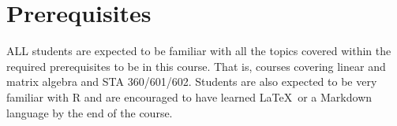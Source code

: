 \documentclass[11pt, a4paper]{article}
\begin{document}





\section{Prerequisites}
ALL students are expected to be familiar with all the topics covered within the required prerequisites to be in this course. That is, courses covering linear and matrix algebra and STA 360/601/602. Students are also expected to be very familiar with \textsf{R} and are encouraged to have learned \LaTeX \ or a Markdown language by the end of the course.
\end{document}

